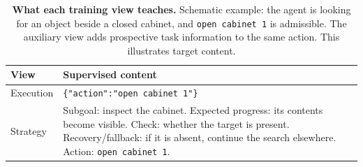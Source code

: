 \begin{table}[H]
\caption{\textbf{What each training view teaches.} Schematic example:
the agent is looking for an object beside a closed cabinet, and
\texttt{open cabinet 1} is admissible. The auxiliary view adds prospective
task information to the same action. This illustrates target content.}
\label{tab:views-example}
\centering\small
\begin{tabularx}{\linewidth}{@{}L{1.10in}X@{}}
\toprule
View & Supervised content\\
\midrule
Execution & \texttt{\{"action":"open cabinet 1"\}}\\
Strategy & Subgoal: inspect the cabinet. Expected progress: its contents
become visible. Check: whether the target is present. Recovery/fallback:
if it is absent, continue the search elsewhere. Action:
\texttt{open cabinet 1}.\\
\bottomrule
\end{tabularx}
\end{table}
